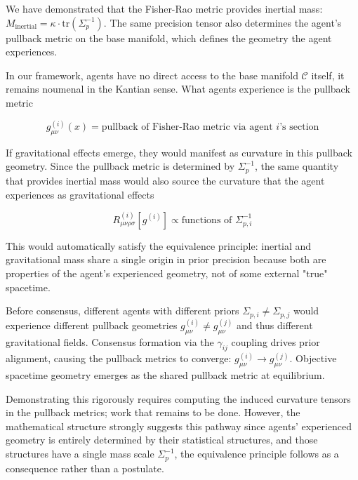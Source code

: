 \documentclass[11pt]{article}
\begin{document}
We have demonstrated that the Fisher-Rao metric provides inertial mass:
$M_{\text{inertial}} = \kappa \cdot \mathrm{tr}(\Sigma_p^{-1})$. The same precision tensor also determines the agent's pullback metric on the base manifold, which defines the geometry the agent experiences.

In our framework, agents have no direct access to the base manifold $\mathcal{C}$ itself, it remains noumenal in the Kantian sense. What agents experience is the pullback metric

\begin{equation}
g_{\mu\nu}^{(i)}(x) = \text{pullback of Fisher-Rao metric via agent } i\text{'s section}
\end{equation}

If gravitational effects emerge, they would manifest as curvature in this pullback geometry. Since the pullback metric is determined by $\Sigma_p^{-1}$, the same quantity that provides inertial mass would also source the curvature that the agent experiences as gravitational effects

\begin{equation}
R_{\mu\nu\rho\sigma}^{(i)}[g^{(i)}] \propto \text{functions of } \Sigma_{p,i}^{-1}
\end{equation}

This would automatically satisfy the equivalence principle: inertial and gravitational mass share a single origin in prior precision because both are properties of the agent's experienced geometry, not of some external "true" spacetime.

Before consensus, different agents with different priors $\Sigma_{p,i} \neq \Sigma_{p,j}$ would experience different pullback geometries $g^{(i)}_{\mu\nu} \neq g^{(j)}_{\mu\nu}$ and thus different gravitational fields. Consensus formation via the $\gamma_{ij}$ coupling drives prior alignment, causing the pullback metrics to converge: $g^{(i)}_{\mu\nu} \to g^{(j)}_{\mu\nu}$. Objective spacetime geometry emerges as the shared pullback metric at equilibrium.

Demonstrating this rigorously requires computing the induced curvature tensors in the pullback metrics; work that remains to be done. However, the mathematical structure strongly suggests this pathway since agents' experienced geometry is entirely determined by their statistical structures, and those structures have a single mass scale $\Sigma_p^{-1}$, the equivalence principle follows as a consequence rather than a postulate.
\end{document}
